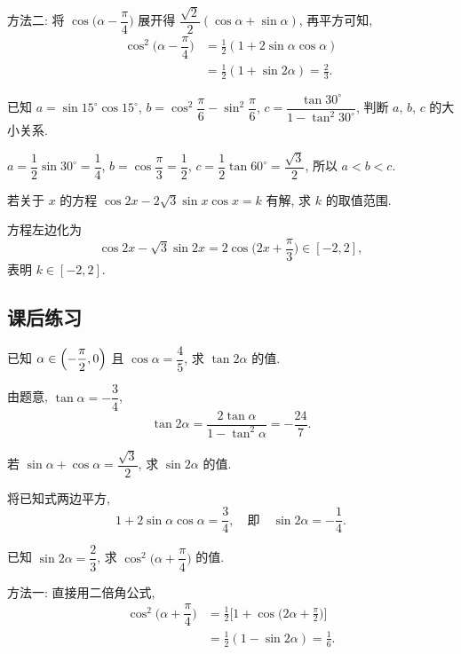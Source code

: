     方法二: 将 $\cos\Big(\alpha- \dfrac\pi4\Big)$ 展开得 $\dfrac{\sqrt2}2(\cos\alpha+ \sin\alpha)$, 再平方可知,
    \[\begin{aligned}
        \cos^2\Big(\alpha- \dfrac\pi4\Big)
        &= \frac12(1+2\sin\alpha\cos\alpha)\\
        &= \frac12(1+ \sin2\alpha)
         = \frac23.
    \end{aligned}\]
\endsolution

\begin{exercise}
    已知 $a=\sin15^\circ\cos15^\circ$, 
    $b=\cos^2 \dfrac\pi6-\sin^2 \dfrac\pi6$,
    $c=\dfrac{\tan30^\circ}{1-\tan^2 30^\circ}$, 
    判断 $a$, $b$, $c$ 的大小关系.
\end{exercise}
\beginsolution
    $a= \dfrac12\sin30^\circ= \dfrac14$, 
    $b= \cos\dfrac\pi3= \dfrac12$,
    $c= \dfrac12\tan60^\circ= \dfrac{\sqrt3}2$, 所以 $a<b<c$.
\endsolution

\begin{exercise}
    若关于 $x$ 的方程 $\cos2x-2\sqrt3 \sin x\cos x=k$ 有解, 
    求 $k$ 的取值范围.
\end{exercise}
\beginsolution
    方程左边化为
    \[\cos2x- \sqrt3\sin2x= 2\cos\biggl(2x+ \frac\pi3\biggr)
        \in [-2,2],\]
    表明 $k\in [-2,2]$.
\endsolution

\subsection{课后练习}

\begin{exercise}
    已知 $\alpha\in\Bigl(-\dfrac\pi2,0\Bigr)$ 且 
    $\cos\alpha= \dfrac45$, 求 $\tan2\alpha$ 的值.
\end{exercise}
\beginsolution
    由题意, $\tan\alpha= -\dfrac34$, 
    \[\tan2\alpha= \frac{2\tan\alpha}{1- \tan^2\alpha}
        = -\frac{24}{7}.\]
\endsolution

\begin{exercise}
    若 $\sin\alpha+\cos\alpha= \dfrac{\sqrt3}2$, 求 $\sin2\alpha$ 的值.
\end{exercise}
\beginsolution
    将已知式两边平方, 
    \[1+ 2\sin\alpha\cos\alpha= \frac34,\quad\text{即}\quad
        \sin2\alpha= -\frac14.\]
\endsolution

\begin{exercise}
    已知 $\sin2\alpha= \dfrac23$, 求 $\cos^2\Big(\alpha+ \dfrac\pi4\Big)$ 的值.
\end{exercise}
\beginsolution
    方法一: 
    直接用二倍角公式,
    \[\begin{aligned}
        \cos^2\Big(\alpha+ \dfrac\pi4\Big)
        &= \frac12\biggl[1+ \cos\biggl(2\alpha+ \frac\pi2\biggr)\biggr]\\
        &= \frac12(1- \sin2\alpha)
         = \frac16.
    \end{aligned}\]

